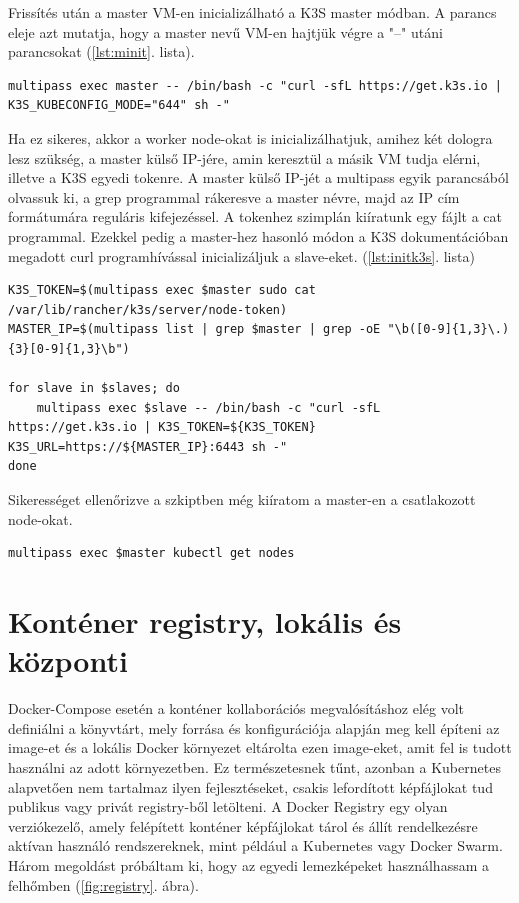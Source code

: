 \noindent
Frissítés után a master VM-en inicializálható a K3S master módban. A parancs eleje azt mutatja, hogy a master nevű VM-en hajtjük végre a "--" utáni parancsokat (\ref{lst:minit}. lista).
\begin{lstlisting}[caption={K3S Master inicializálása},label={lst:minit}]
multipass exec master -- /bin/bash -c "curl -sfL https://get.k3s.io | K3S_KUBECONFIG_MODE="644" sh -"
\end{lstlisting}
\noindent
Ha ez sikeres, akkor a worker node-okat is inicializálhatjuk, amihez két dologra lesz szükség, a master külső IP-jére, amin keresztül a másik VM tudja elérni, illetve a K3S egyedi tokenre. A master külső IP-jét a multipass egyik parancsából olvassuk ki, a grep programmal rákeresve a master névre, majd az IP cím formátumára reguláris kifejezéssel. A tokenhez szimplán kiíratunk egy fájlt a cat programmal. Ezekkel pedig a master-hez hasonló módon a K3S dokumentációban megadott curl programhívással inicializáljuk a slave-eket. (\ref{lst:initk3s}. lista)
\begin{lstlisting}[caption={K3S Slave-ek inicializálása},label={lst:initk3s}]
K3S_TOKEN=$(multipass exec $master sudo cat /var/lib/rancher/k3s/server/node-token)
MASTER_IP=$(multipass list | grep $master | grep -oE "\b([0-9]{1,3}\.){3}[0-9]{1,3}\b")

for slave in $slaves; do
	multipass exec $slave -- /bin/bash -c "curl -sfL https://get.k3s.io | K3S_TOKEN=${K3S_TOKEN} K3S_URL=https://${MASTER_IP}:6443 sh -"
done
\end{lstlisting}

\noindent
Sikerességet ellenőrizve a szkiptben még kiíratom a master-en a csatlakozott node-okat.
\begin{lstlisting}[caption={Node-ok lekérdezése}]
multipass exec $master kubectl get nodes
\end{lstlisting}

\section{Konténer registry, lokális és központi}
Docker-Compose esetén a konténer kollaborációs megvalósításhoz elég volt definiálni a könyvtárt, mely forrása és konfigurációja alapján meg kell építeni az image-et és a lokális Docker környezet eltárolta ezen image-eket, amit fel is tudott használni az adott környezetben. Ez természetesnek tűnt, azonban a Kubernetes alapvetően nem tartalmaz ilyen fejlesztéseket, csakis lefordított képfájlokat tud publikus vagy privát registry-ből letölteni. A Docker Registry egy olyan verziókezelő, amely felépített konténer képfájlokat tárol és állít rendelkezésre aktívan használó rendszereknek, mint például a Kubernetes vagy Docker Swarm. Három megoldást próbáltam ki, hogy az egyedi lemezképeket használhassam a felhőmben (\ref{fig:registry}. ábra).\\

